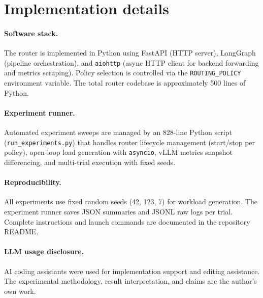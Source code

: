 \documentclass{article}
\begin{document}
\section{Implementation details}
\label{app:implementation}

\paragraph{Software stack.} The router is implemented in Python using FastAPI (HTTP server), LangGraph (pipeline orchestration), and \texttt{aiohttp} (async HTTP client for backend forwarding and metrics scraping). Policy selection is controlled via the \texttt{ROUTING\_POLICY} environment variable. The total router codebase is approximately 500 lines of Python.

\paragraph{Experiment runner.} Automated experiment sweeps are managed by an 828-line Python script (\texttt{run\_experiments.py}) that handles router lifecycle management (start/stop per policy), open-loop load generation with \texttt{asyncio}, vLLM metrics snapshot differencing, and multi-trial execution with fixed seeds.

\paragraph{Reproducibility.} All experiments use fixed random seeds (42, 123, 7) for workload generation. The experiment runner saves JSON summaries and JSONL raw logs per trial. Complete instructions and launch commands are documented in the repository README.

\paragraph{LLM usage disclosure.} AI coding assistants were used for implementation support and editing assistance. The experimental methodology, result interpretation, and claims are the author's own work.

\newpage

\end{document}
